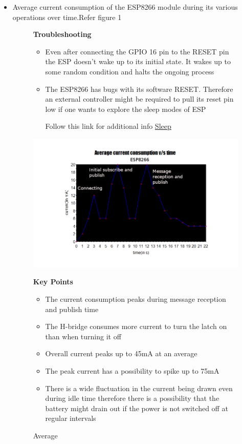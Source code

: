 \documentclass[16pt]{article}
\begin{document}
\begin{itemize}

\item
  Average current consumption of the ESP8266 module during its various
  operations over time.Refer figure 1 


\begin{figure}

\textbf{Troubleshooting}

\vspace{0.2cm}
\begin{itemize}
\item
  Even after connecting the GPIO 16 pin to the RESET pin the ESP doesn't
  wake up to its initial state. It wakes up to some random condition and
  halts the ongoing process
\item
  The ESP8266 has bugs with its software RESET. Therefore an external
  controller might be required to pull its reset pin low if one wants to
  explore the sleep modes of ESP
  
  Follow this link for additional info
{\color{red}\href{http://tinker.yeoman.com.au/2015/03/08/reducing-esp8266-power-consumption-using-deep-sleep/}{Sleep}}
\end{itemize}
\includegraphics[width=1.2\textwidth]{images/average_current1.png}
\caption{Average}
\textbf{Key Points}

  \begin{itemize}

  \item
    The current consumption peaks during message reception and publish
    time
  \item
    The H-bridge consumes more current to turn the latch on than when
    turning it off
  \item
    Overall current peaks up to 45mA at an average
  \item
    The peak current has a possibility to spike up to 75mA
  \item
    There is a wide fluctuation in the current being drawn even during
    idle time therefore there is a possibility that the battery might
    drain out if the power is not switched off at regular intervals
  \end{itemize}
\end{figure}



\end{itemize}
\end{document}
